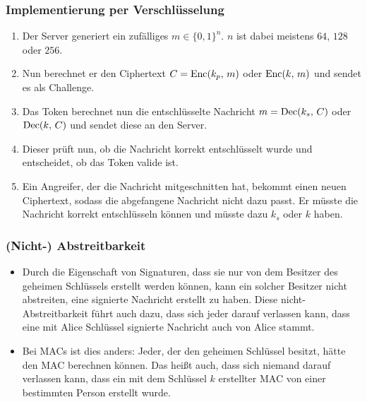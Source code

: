             \subsubsection{Implementierung per Verschlüsselung}
                \begin{enumerate}
                	\item Der Server generiert ein zufälliges \(m \in \{0,1\}^n\). \(n\) ist dabei meistens \(64\), \(128\) oder \(256\).
                	\item Nun berechnet er den Ciphertext \( C = \operatorname{Enc}(k_p,\, m) \) oder \( \operatorname{Enc}(k,\, m) \) und sendet es als Challenge.
                	\item Das Token berechnet nun die entschlüsselte Nachricht \( m = \operatorname{Dec}(k_s,\, C) \) oder \( \operatorname{Dec}(k,\, C) \) und sendet diese an den Server.
                	\item Dieser prüft nun, ob die Nachricht korrekt entschlüsselt wurde und entscheidet, ob das Token valide ist.
                	\item Ein Angreifer, der die Nachricht mitgeschnitten hat, bekommt einen neuen Ciphertext, sodass die abgefangene Nachricht nicht dazu passt. Er müsste die Nachricht korrekt entschlüsseln können und müsste dazu \(k_s\) oder \(k\) haben.
                \end{enumerate}
            
            \subsubsection{(Nicht-) Abstreitbarkeit}
	            \begin{itemize}
	            	\item Durch die Eigenschaft von Signaturen, dass sie nur von dem Besitzer des geheimen Schlüssels erstellt werden können, kann ein solcher Besitzer nicht abstreiten, eine signierte Nachricht erstellt zu haben. Diese nicht-Abstreitbarkeit führt auch dazu, dass sich jeder darauf verlassen kann, dass eine mit Alice Schlüssel signierte Nachricht auch von Alice stammt.
	            	\item Bei MACs ist dies anders: Jeder, der den geheimen Schlüssel besitzt, hätte den MAC berechnen können. Das heißt auch, dass sich niemand darauf verlassen kann, dass ein mit dem Schlüssel \(k\) erstellter MAC von einer bestimmten Person erstellt wurde.
	            \end{itemize}

